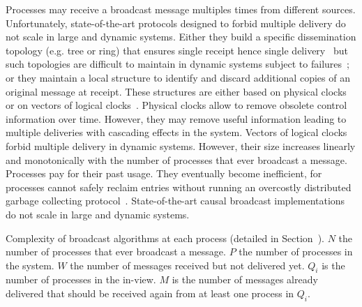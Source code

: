 Processes may receive a broadcast message multiples times from different
sources. Unfortunately, state-of-the-art protocols designed to forbid multiple
delivery do not scale in large and dynamic systems. Either they build a specific
dissemination topology (e.g. tree or ring) that ensures single receipt hence
single delivery~\cite{bravo2017saturn,raynal2013distributed} but such topologies
are difficult to maintain in dynamic systems subject to
failures~\cite{krasikova2016hashtable}; or they maintain a local structure to
identify and discard additional copies of an original message at receipt. These
structures are either based on physical
clocks~\cite{cachin2011introduction,demers1987epidemic} or on vectors of logical
clocks~\cite{malkhi2007concise,mukund2014optimized}. Physical clocks allow to
remove obsolete control information over time. However, they may remove useful
information leading to multiple deliveries with cascading effects in the
system. Vectors of logical clocks forbid multiple delivery in dynamic
systems. However, their size increases linearly and monotonically with the
number of processes that ever broadcast a message. Processes pay for their past
usage. They eventually become inefficient, for processes cannot safely reclaim
entries without running an overcostly distributed garbage collecting
protocol~\cite{abdullahi1998garbage}. State-of-the-art causal broadcast
implementations do not scale in large and dynamic systems.




\begin{table}
  \begin{center}
    \caption{\label{table:complexity} Complexity of broadcast algorithms at each
      process (detailed in Section~\cite{subsec:complexity}). $N$ the number of
      processes that ever broadcast a message. $P$ the number of processes in
      the system. $W$ the number of messages received but not delivered
      yet. $Q_i$ is the number of processes in the in-view. $M$ is the number of
      messages already delivered that should be received again from at least one
      process in $Q_i$.}
  
  \end{center}
\end{table}

